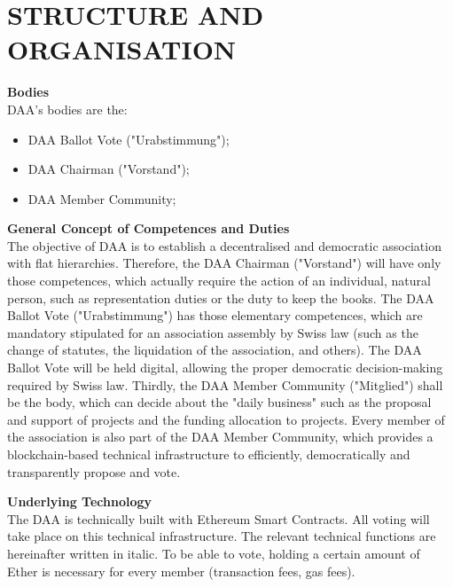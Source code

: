 \section{STRUCTURE AND ORGANISATION}\label{sec:structure-and-organisation}

\item \textbf{Bodies} \\
DAA's bodies are the:
\begin{itemize}
    \item DAA Ballot Vote ("Urabstimmung");
    \item DAA Chairman ("Vorstand");
    \item DAA Member Community;
\end{itemize}

\item \textbf{General Concept of Competences and Duties} \\
The objective of DAA is to establish a decentralised and democratic association with flat hierarchies.
Therefore, the DAA Chairman ("Vorstand") will have only those competences, which actually require the action of an individual, natural person, such as representation duties or the duty to keep the books.
The DAA Ballot Vote ("Urabstimmung") has those elementary competences, which are mandatory stipulated for an association assembly by Swiss law (such as the change of statutes, the liquidation of the association, and others).
The DAA Ballot Vote will be held digital, allowing the proper democratic decision-making required by Swiss law.
Thirdly, the DAA Member Community ("Mitglied") shall be the body, which can decide about the "daily business" such as the proposal and support of projects and the funding allocation to projects.
Every member of the association is also part of the DAA Member Community, which provides a blockchain-based technical infrastructure to efficiently, democratically and transparently propose and vote.

\item \textbf{Underlying Technology} \\
The DAA is technically built with Ethereum Smart Contracts.
All voting will take place on this technical infrastructure.
The relevant technical functions are hereinafter written in italic.
To be able to vote, holding a certain amount of Ether is necessary for every member (transaction fees, gas fees).

